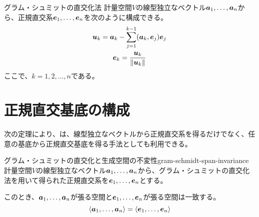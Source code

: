\documentclass[../../../topic_linear-algebra]{subfiles}
\begin{document}
\begin{theorem*}{グラム・シュミットの直交化法}
  計量空間$V$の線型独立なベクトル$\vb*{a}_1, \ldots, \vb*{a}_n$から、正規直交系$\vb*{e}_1, \ldots, \vb*{e}_n$を次のように構成できる。
  \begin{gather*}
    \vb*{u}_k = \vb*{a}_k - \sum_{j=1}^{k-1} (\vb*{a}_k, \vb*{e}_j) \vb*{e}_j \\
    \vb*{e}_k = \frac{\vb*{u}_k}{\|\vb*{u}_k\|}
  \end{gather*}
  ここで、$k = 1, 2, \ldots, n$である。
\end{theorem*}

\sectionline
\section{正規直交基底の構成}

次の定理により、は、線型独立なベクトルから正規直交系を得るだけでなく、任意の基底から正規直交基底を得る手法としても利用できる。

\begin{theorem}{グラム・シュミットの直交化と生成空間の不変性}{gram-schmidt-span-invariance}
  計量空間$V$の線型独立なベクトル$\vb*{a}_1, \ldots, \vb*{a}_n$から、グラム・シュミットの直交化法を用いて得られた正規直交系を$\vb*{e}_1, \ldots, \vb*{e}_n$とする。
  
  このとき、$\vb*{a}_1,\ldots,\vb*{a}_n$が張る空間と$\vb*{e}_1,\ldots,\vb*{e}_n$が張る空間は一致する。
  \begin{equation*}
    \langle \vb*{a}_1, \ldots, \vb*{a}_n \rangle = \langle \vb*{e}_1, \ldots, \vb*{e}_n \rangle
  \end{equation*}
\end{theorem}
\end{document}
